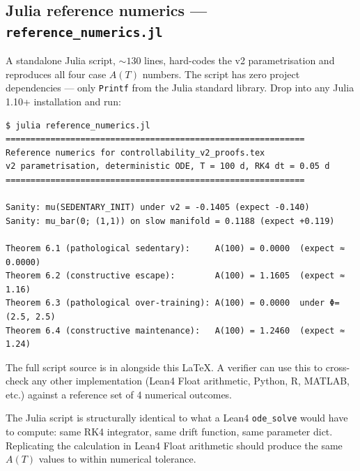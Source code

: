 \documentclass[11pt,a4paper]{article}
\theoremstyle{definition}
\begin{document}
\subsection{Julia reference numerics — \texttt{reference\_numerics.jl}}

A standalone Julia script, $\sim 130$ lines, hard-codes the v2 parametrisation and reproduces all four case $A(T)$ numbers. The script has zero project dependencies — only \texttt{Printf} from the Julia standard library. Drop into any Julia 1.10+ installation and run:
\begin{lstlisting}[language={}]
$ julia reference_numerics.jl
============================================================
Reference numerics for controllability_v2_proofs.tex
v2 parametrisation, deterministic ODE, T = 100 d, RK4 dt = 0.05 d
============================================================

Sanity: mu(SEDENTARY_INIT) under v2 = -0.1405 (expect -0.140)
Sanity: mu_bar(0; (1,1)) on slow manifold = 0.1188 (expect +0.119)

Theorem 6.1 (pathological sedentary):     A(100) = 0.0000  (expect ≈ 0.0000)
Theorem 6.2 (constructive escape):        A(100) = 1.1605  (expect ≈ 1.16)
Theorem 6.3 (pathological over-training): A(100) = 0.0000  under Φ=(2.5, 2.5)
Theorem 6.4 (constructive maintenance):   A(100) = 1.2460  (expect ≈ 1.24)
\end{lstlisting}

The full script source is in  alongside this LaTeX. A verifier can use this to cross-check any other implementation (Lean4 Float arithmetic, Python, R, MATLAB, etc.) against a reference set of 4 numerical outcomes.

The Julia script is structurally identical to what a Lean4 \texttt{ode\_solve} would have to compute: same RK4 integrator, same drift function, same parameter dict. Replicating the calculation in Lean4 Float arithmetic should produce the same $A(T)$ values to within numerical tolerance.
\end{document}

